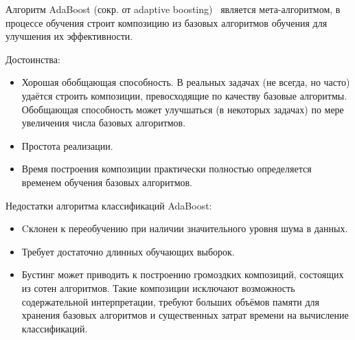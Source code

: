 Алгоритм AdaBoost (сокр. от adaptive boosting)~\cite{ada_boost} является мета-алгоритмом, в процессе обучения 
строит композицию из базовых алгоритмов обучения для улучшения их эффективности.

Достоинства:
\begin{itemize}
 \item Хорошая обобщающая способность. В реальных задачах (не всегда, но часто) удаётся строить композиции, 
превосходящие по качеству базовые алгоритмы. Обобщающая способность может улучшаться (в некоторых задачах) 
по мере увеличения числа базовых алгоритмов.
 \item Простота реализации.
 \item Время построения композиции практически полностью определяется временем обучения базовых алгоритмов.
\end{itemize}


Недостатки алгоритма классификаций AdaBoost:
\begin{itemize}
 \item Cклонен к переобучению при наличии значительного уровня шума в данных.
 \item Требует достаточно длинных обучающих выборок.
 \item Бустинг может приводить к построению громоздких композиций, состоящих из сотен алгоритмов. 
 Такие композиции исключают возможность содержательной интерпретации, требуют больших объёмов памяти 
 для хранения базовых алгоритмов и существенных затрат времени на вычисление классификаций.
\end{itemize}